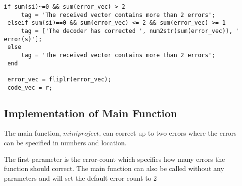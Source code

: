 \documentclass[Main]{subfiles}
\begin{document}
\begin{lstlisting}[caption=Meggitt decode return, style=Code-Matlab, label=lst:DecodeReturn]
 if sum(si)~=0 && sum(error_vec) > 2
     tag = 'The received vector contains more than 2 errors';
 elseif sum(si)==0 && sum(error_vec) <= 2 && sum(error_vec) >= 1
     tag = ['The decoder has corrected ', num2str(sum(error_vec)), ' error(s)'];
 else
     tag = 'The received vector contains more than 2 errors';
 end
 
 error_vec = fliplr(error_vec);
 code_vec = r;
\end{lstlisting}

\subsection{Implementation of Main Function}
The main function, $miniproject$, can correct up to two errors where the errors can be specified in numbers and location.

The first parameter is the error-count which specifies how many errors the function should correct.
The main function can also be called without any parameters and will set the default error-count to 2   
\end{document}
